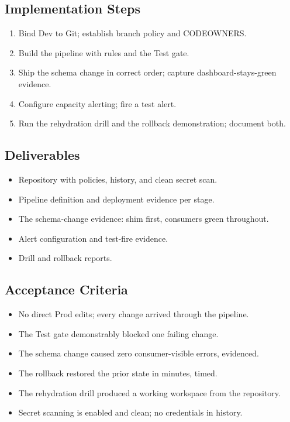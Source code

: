 \subsection*{Implementation Steps}
\begin{enumerate}
    \item Bind Dev to Git; establish branch policy and CODEOWNERS.
    \item Build the pipeline with rules and the Test gate.
    \item Ship the schema change in correct order; capture dashboard-stays-green evidence.
    \item Configure capacity alerting; fire a test alert.
    \item Run the rehydration drill and the rollback demonstration; document both.
\end{enumerate}

\subsection*{Deliverables}
\begin{itemize}
    \item Repository with policies, history, and clean secret scan.
    \item Pipeline definition and deployment evidence per stage.
    \item The schema-change evidence: shim first, consumers green throughout.
    \item Alert configuration and test-fire evidence.
    \item Drill and rollback reports.
\end{itemize}

\subsection*{Acceptance Criteria}
\begin{itemize}
    \item[\(\square\)] No direct Prod edits; every change arrived through the pipeline.
    \item[\(\square\)] The Test gate demonstrably blocked one failing change.
    \item[\(\square\)] The schema change caused zero consumer-visible errors, evidenced.
    \item[\(\square\)] The rollback restored the prior state in minutes, timed.
    \item[\(\square\)] The rehydration drill produced a working workspace from the repository.
    \item[\(\square\)] Secret scanning is enabled and clean; no credentials in history.
\end{itemize}

